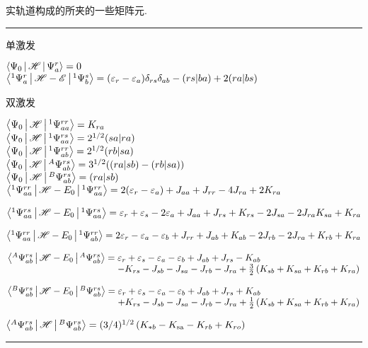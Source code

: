 \begin{table}[H]
		\caption{{实轨道构成的}所夹的一些矩阵元.}
		\hrule
		\vspace{5pt}
        单激发\par
        $\Braket{\Psi_0|\mathscr{H}|\Psi_{a}^{r}} = 0$\\
        $\Braket{^1\Psi_a^r|\mathscr{H}-\mathscr{E}|^1\Psi_b^s} = (\varepsilon_r-\varepsilon_a)\delta_{rs}\delta_{ab}-(rs|ba)+2(ra|bs)$
        \par
        \mbox{}\par
        双激发\par
        $\Braket{\Psi_0|\mathscr{H}|^1\Psi_{aa}^{rr}}  = K_{ra}$\\
        $\Braket{\Psi_0|\mathscr{H}|^1\Psi_{aa}^{rs}} = 2^{1/2}(sa|ra)$\\
        $\Braket{\Psi_0|\mathscr{H}|^1\Psi_{ab}^{rr}} = 2^{1/2}(rb|sa)$\\
        $\Braket{\Psi_0|\mathscr{H}|^A\Psi_{ab}^{rs}} = 3^{1/2}((ra|sb)-(rb|sa))$\\
        $\Braket{\Psi_0|\mathscr{H}|^B\Psi_{ab}^{rs}} = (ra|sb)$\\
        $\Braket{^1\Psi_{aa}^{rr}|\mathscr{H}-E_0|^1\Psi_{aa}^{rr}} = 2(\varepsilon_r-\varepsilon_a) + J_{aa} + J_{rr} -4J_{ra} + 2K_{ra}
        $\par
        $\Braket{^1\Psi_{aa}^{rs}|\mathscr{H}-E_0|^1\Psi_{aa}^{rs}} = \varepsilon_r+\varepsilon_s -2\varepsilon_{a}+ J_{aa} + J_{rs} +K_{rs} -2J_{sa} -2J_{ra} K_{sa} + K_{ra}
        $\par
        $\Braket{^1\Psi_{aa}^{rr}|\mathscr{H}-E_0|^1\Psi_{ab}^{rr}} = 2\varepsilon_r-\varepsilon_a -\varepsilon_{b}+ J_{rr} + J_{ab} +K_{ab} -2J_{rb} -2J_{ra} + K_{rb} + K_{ra}
        $\par
        $\arraycolsep=1.4pt\begin{array}[t]{ll}\braket{^A\Psi_{ab}^{rs}|\hs-E_0|^A\Psi_{ab}^{rs}} =& 
         \epsilon_{r}+\epsilon_{s}-\epsilon_{a}-\epsilon_{b}+J_{a b}+J_{r s}-K_{a b} \\
        &-K_{r s}-J_{s b}-J_{s a}-J_{r b}-J_{r a}+\frac{3}{2}\left(K_{s b}+K_{s a}+K_{r b}+K_{r a}\right)\end{array}$\par
        $\arraycolsep=1.4pt
        \begin{array}[t]{ll}\braket{^B\Psi_{ab}^{rs}|\hs-E_0|^B\Psi_{ab}^{rs}} = &\varepsilon_{r}+\varepsilon_{s}-\varepsilon_{a}-\varepsilon_{b}+J_{a b}+J_{r s}+K_{a b}\\
        &+K_{r s}-J_{s b}-J_{s a}-J_{r b}-J_{r a}+\frac{1}{2}\left(K_{s b}+K_{s a}+K_{r b}+K_{r a}\right)\end{array}$\par
        $\Braket{^A\Psi_{ab}^{rs}|\mathscr{H}|^B\Psi_{ab}^{rs}}=(3 / 4)^{1 / 2}\left(K_{* b}-K_{\mathrm{sa}}-K_{r b}+K_{r o}\right)$
        \vspace{5pt}
		\hrule
	\end{table}



